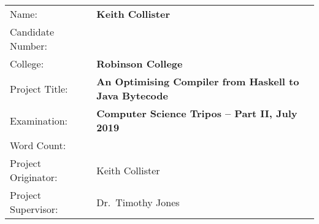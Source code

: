 \documentclass[dissertation.tex, 12pt]{subfiles}
\begin{document}
{\large
\begin{tabular}{ll}
Name:               & \textbf{Keith Collister} \\
Candidate Number:   & \textbf{} \\
College:            & \textbf{Robinson College} \\
Project Title:      & \textbf{An Optimising Compiler from Haskell to Java Bytecode} \\
Examination:        & \textbf{Computer Science Tripos -- Part II, July 2019} \\
Word Count:         & \textbf{} \\
Project Originator: & Keith Collister \\
Project Supervisor: & Dr.\ Timothy Jones \\ 
\end{tabular}
}
\end{document}
